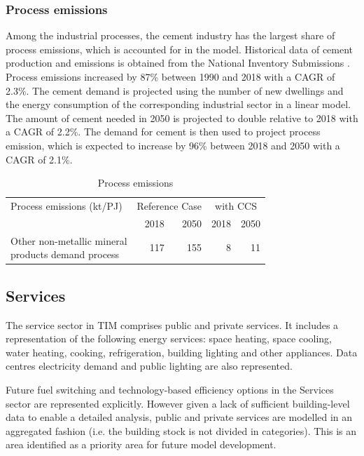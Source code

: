 \documentclass[gmd,manuscript]{copernicus}
\begin{document}
\subsubsection{Process emissions}
Among the industrial processes, the cement industry has the largest share of process emissions, which is accounted for in the model. Historical data of cement production and emissions is obtained from the National Inventory Submissions \citep{NIR2020E91:online}. Process emissions increased by 87\% between 1990 and 2018 with a CAGR of 2.3\%. The cement demand is projected using the number of new dwellings and the energy consumption of the corresponding industrial sector in a linear model. The amount of cement needed in 2050 is projected to double relative to 2018 with a CAGR of 2.2\%. The demand for cement is then used to project process emission, which is expected to increase by 96\% between 2018 and 2050 with a CAGR of 2.1\%. 

\begin{table}[htbp]
\footnotesize
 \centering
 \caption{Process emissions}
 \begin{tabular}{lrrrr}
 \hline
 Process emissions (kt/PJ) & \multicolumn{2}{c}{Reference Case} & \multicolumn{2}{c}{with CCS} \\
 & 2018 & 2050 & 2018 & 2050 \\ \hline
 \makecell{Other non-metallic mineral \\ products demand process} & 117 & 155 & 8 & 11 \\ \hline
 \end{tabular}%
 \label{table: process emissions}%
\end{table}%


\subsection{Services}
\label{ss:services}
The service sector in TIM comprises public and private services. It includes a representation of the following energy services: space heating, space cooling, water heating, cooking, refrigeration, building lighting and other appliances. Data centres electricity demand and public lighting are also represented.

Future fuel switching and technology-based efficiency options in the Services sector are represented explicitly. However given a lack of sufficient building-level data to enable a detailed analysis, public and private services are modelled in an aggregated fashion (i.e. the building stock is not divided in categories). This is an area identified as a priority area for future model development. 
\end{document}
